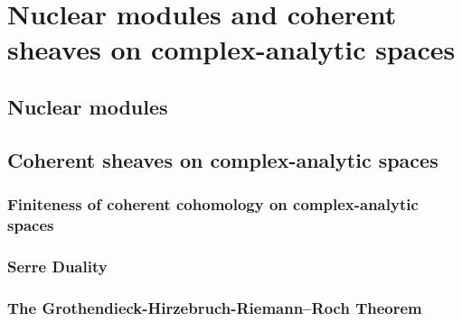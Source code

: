 \section{Nuclear modules and coherent sheaves on complex-analytic spaces}
    \subsection{Nuclear modules}
    
    \subsection{Coherent sheaves on complex-analytic spaces}
        \subsubsection{Finiteness of coherent cohomology on complex-analytic spaces}
        
        \subsubsection{Serre Duality}
        
        \subsubsection{The Grothendieck-Hirzebruch-Riemann–Roch Theorem}